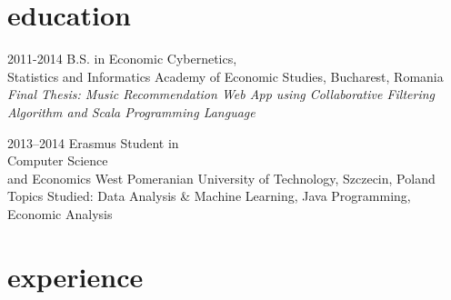 \documentclass[]{friggeri-cv}
\begin{document}
\section{education}

\begin{entrylist}
  \entry
  {2011-2014}
  {B.S. in Economic Cybernetics,\\ 
  Statistics and Informatics} %
  {Academy of Economic Studies, Bucharest, Romania} %
  {\emph{Final  Thesis:  Music  Recommendation  Web  App using  Collaborative Filtering Algorithm and Scala Programming Language}}

  \entry
  {2013–2014}
  {Erasmus Student in\\
  Computer Science\\
  and Economics}
  {West Pomeranian University of Technology,  Szczecin, Poland}
  {Topics Studied: Data Analysis \&  Machine Learning, Java Programming, Economic Analysis}
  
\end{entrylist}

\section{experience}
\end{document}
